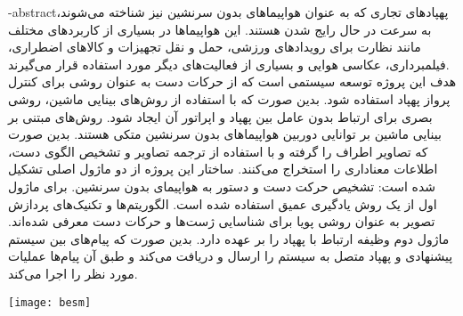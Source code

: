 \department{}
\secondsupervisor{}


\fa-abstract{پهپادهای تجاری که به عنوان هواپیما‌های بدون سرنشین 
نیز شناخته می‌شوند، به سرعت در حال رایج شدن هستند. این هواپیماها در بسیاری از کاربردهای مختلف مانند نظارت برای رویدادهای ورزشی، حمل و نقل تجهیزات
 و کالاهای اضطراری، فیلمبرداری، عکاسی هوایی و بسیاری از فعالیت‌های دیگر مورد استفاده قرار می‌گیرند.
  \\
هدف این پروژه توسعه سیستمی است که از حرکات دست به عنوان روشی برای کنترل پرواز پهپاد استفاده شود.
بدین صورت که با استفاده از روش‌های بینایی ماشین، روشی بصری برای ارتباط بدون عامل بین پهپاد و اپراتور آن ایجاد شود.
 روش‌های مبتنی بر بینایی ماشین بر توانایی دوربین هواپیماهای بدون سرنشین متکی هستند. بدین صورت که تصاویر اطراف را گرفته و با استفاده
 از  ترجمه تصاویر و تشخیص الگوی دست، اطلاعات معناداری را استخراج می‌کنند. ساختار این پروژه از دو ماژول
 اصلی تشکیل شده است: تشخیص حرکت دست
 و دستور به هواپیمای بدون سرنشین. برای ماژول اول از یک روش
 یادگیری عمیق استفاده شده است. الگوریتم‌ها و تکنیک‌های پردازش تصویر به‌ عنوان روشی پویا برای شناسایی ژست‌ها و
 حرکات دست معرفی شده‌اند. ماژول دوم وظیفه ارتباط با پهپاد را بر عهده دارد. بدین صورت که پیام‌های بین سیستم
 پیشنهادی و پهپاد متصل به سیستم را ارسال و دریافت می‌کند و طبق آن پیام‌ها عملیات مورد نظر را اجرا می‌کند.
  }





\vspace*{7cm}
\thispagestyle{empty}
\begin{center}
\texttt{[image: besm]}
\end{center}